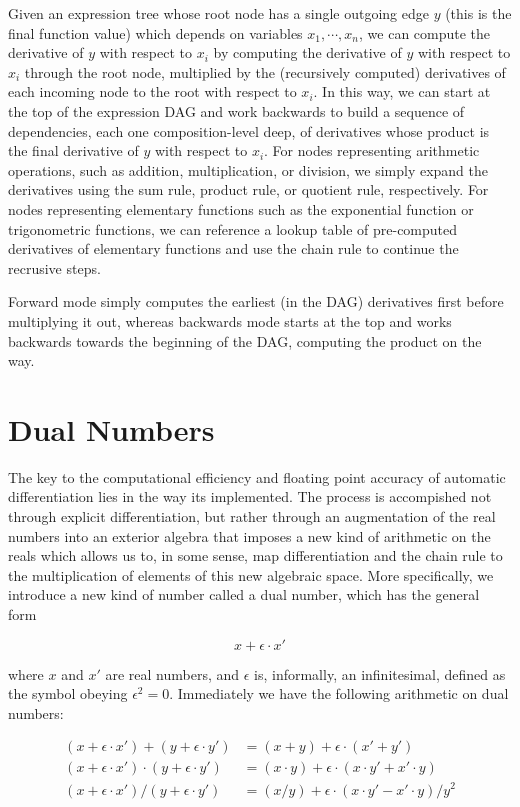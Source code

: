 \documentclass{article}
\begin{document}
Given an expression tree whose root node has a single outgoing edge $ y $ (this is the final function value) which depends on variables $ x_1, \cdots, x_n $, we can compute the derivative of $ y $ with respect to $ x_i $ by computing the derivative of $ y $ with respect to $ x_i $ through the root node, multiplied by the (recursively computed) derivatives of each incoming node to the root with respect to $ x_i $. In this way, we can start at the top of the expression DAG and work backwards to build a sequence of dependencies, each one composition-level deep, of derivatives whose product is the final derivative of $ y $ with respect to $ x_i $. For nodes representing arithmetic operations, such as addition, multiplication, or division, we simply expand the derivatives using the sum rule, product rule, or quotient rule, respectively. For nodes representing elementary functions such as the exponential function or trigonometric functions, we can reference a lookup table of pre-computed derivatives of elementary functions and use the chain rule to continue the recrusive steps.

Forward mode simply computes the earliest (in the DAG) derivatives first before multiplying it out, whereas backwards mode starts at the top and works backwards towards the beginning of the DAG, computing the product on the way.

\section{Dual Numbers}
The key to the computational efficiency and floating point accuracy of automatic differentiation lies in the way its implemented. The process is accompished not through explicit differentiation, but rather through an augmentation of the real numbers into an exterior algebra that imposes a new kind of arithmetic on the reals which allows us to, in some sense, map differentiation and the chain rule to the multiplication of elements of this new algebraic space. More specifically, we introduce a new kind of number called a dual number, which has the general form

    $$ x + \epsilon \cdot x' $$

where $ x $ and $ x' $ are real numbers, and $ \epsilon $ is, informally, an infinitesimal, defined as the symbol obeying $ \epsilon^2 = 0 $. Immediately we have the following arithmetic on dual numbers:

    $$ \begin{aligned}
        (x + \epsilon \cdot x') + (y + \epsilon \cdot y') &= (x + y) + \epsilon \cdot (x' + y') \\
        (x + \epsilon \cdot x') \cdot (y + \epsilon \cdot y') &= (x \cdot y) + \epsilon \cdot (x \cdot y' + x' \cdot y) \\
        (x + \epsilon \cdot x') / (y + \epsilon \cdot y') &= (x / y) + \epsilon \cdot (x \cdot y' - x' \cdot y) / y^2
    \end{aligned} $$
\end{document}
